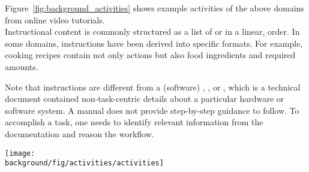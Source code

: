 Figure~\ref{fig:background_activities} shows example activities of the above domains from online video tutorials.
\\

%
Instructional content is commonly structured as a list of  or  in a linear,  order.
%
In some domains, instructions have been derived into specific formats. For example, cooking recipes contain not only actions but also food ingredients and required amounts.

Note that instructions are different from a (software) , , or , which is a technical document contained non-task-centric details about a particular hardware or software system. A manual does not provide step-by-step guidance to follow. To accomplish a task, one needs to identify relevant information from the documentation and reason the workflow.

\begin{figure*}[t]
  \centering
  \begin{minipage}{\textwidth}
  \texttt{[image: \\background/fig/activities/activities]}
  \caption[activities]{Example activities in tutorial domains:
  a) image manipulations using a software application
  \footnote{Photoshop Playbook: Selective Focus \url{https://youtu.be/Wh3ahxqDnyw}},
  b) wrapping a gift, a DIY task
  \footnote{One Kings Lane: How to Wrap the Perfect Gift \url{https://youtu.be/Me3ykrZobJE}},
  c) cooking, an everyday activity
  \footnote{Slow-cooked black treacle ham \url{http://www.bbc.co.uk/food/recipes/slow-cooked_black_21152}}, and
  d) ballet dancing in sports
  \footnote{Ballet 101: How to Do the Fouette in Ballet Dancing \url{https://youtu.be/DzqQNlaahjs}}.
  }
  \label{fig:background_activities}
  \end{minipage}
\end{figure*}


